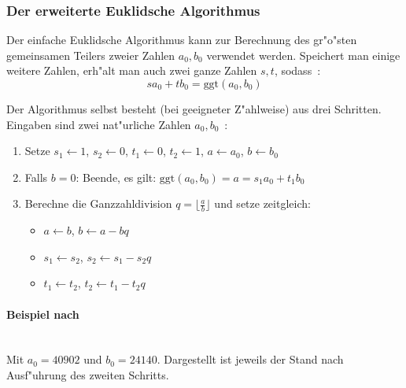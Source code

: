 \documentclass[12pt]{article}
\newcommand{\floor}[1]{\lfloor #1 \rfloor}
\begin{document}
\subsubsection{Der erweiterte Euklidsche Algorithmus}
\label{subsubsec:math:euclid}
Der einfache Euklidsche Algorithmus kann zur Berechnung des gr"o"sten gemeinsamen
Teilers zweier Zahlen $a_0, b_0$ verwendet werden.
Speichert man einige weitere Zahlen, erh"alt man auch zwei ganze Zahlen $s, t$, sodass~\cite{taocp2}:
\begin{equation}\label{eq:euclid} sa_0 + tb_0 = \textrm{ggt}(a_0, b_0) \end{equation}

Der Algorithmus selbst besteht (bei geeigneter Z"ahlweise) aus drei Schritten.
Eingaben sind zwei nat"urliche Zahlen $a_0, b_0$~\cite{taocp2}:
\begin{enumerate}
    \item Setze $s_1 \gets 1$, $s_2 \gets 0$, $t_1 \gets 0$, $t_2 \gets 1$, $a \gets a_0$, $b \gets b_0$
    \item Falls $b = 0$: Beende, es gilt: $\textrm{ggt}(a_0, b_0) = a = s_1 a_0 + t_1 b_0$
    \item Berechne die Ganzzahldivision $q = \floor{\frac{a}{b}}$ und setze zeitgleich:
    \begin{itemize}
        \item $a \gets b$, $b \gets a - bq$
        \item $s_1 \gets s_2$, $s_2 \gets s_1 - s_2 q$
        \item $t_1 \gets t_2$, $t_2 \gets t_1 - t_2 q$
    \end{itemize}
\end{enumerate}\cite{taocp2}

\paragraph{Beispiel nach~\cite{taocp2}}
~\\
Mit $a_0 = 40902$ und $b_0 = 24140$.
Dargestellt ist jeweils der Stand nach Ausf"uhrung des zweiten Schritts.\\
\end{document}
